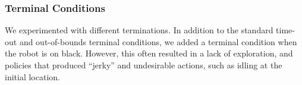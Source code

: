 \begin{appendices}
\subsubsection{Terminal Conditions}
We experimented with different terminations. In addition to the standard time-out and out-of-bounds terminal conditions, we added a terminal condition when the robot is on black. However, this often resulted in a lack of exploration, and policies that produced ``jerky'' and undesirable actions, such as idling at the initial location.



\end{appendices}




